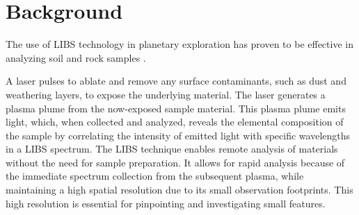 \section{Background}\label{sec:background}
The use of LIBS technology in planetary exploration has proven to be effective in analyzing soil and rock samples \citep{knight2000}.

A laser pulses to ablate and remove any surface contaminants, such as dust and weathering layers, to expose the underlying material.
The laser generates a plasma plume from the now-exposed sample material.
This plasma plume emits light, which, when collected and analyzed, reveals the elemental composition of the sample by correlating the intensity of emitted light with specific wavelengths in a LIBS spectrum.
The LIBS technique enables remote analysis of materials without the need for sample preparation.
It allows for rapid analysis because of the immediate spectrum collection from the subsequent plasma, while maintaining a high spatial resolution due to its small observation footprints.
This high resolution is essential for pinpointing and investigating small features. \cite{wiensChemcam2012}




